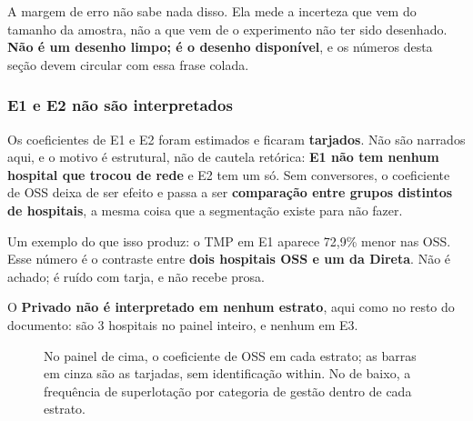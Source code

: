 A margem de erro não sabe nada disso. Ela mede a incerteza que vem do
tamanho da amostra, não a que vem de o experimento não ter sido desenhado.
\textbf{Não é um desenho limpo; é o desenho disponível}, e os números desta
seção devem circular com essa frase colada.

\subsubsection*{E1 e E2 não são interpretados}

Os coeficientes de E1 e E2 foram estimados e ficaram \textbf{tarjados}.
Não são narrados aqui, e o motivo é estrutural, não de cautela retórica:
\textbf{E1 não tem nenhum hospital que trocou de rede} e E2 tem um só. Sem
conversores, o coeficiente de OSS deixa de ser efeito e passa a ser
\textbf{comparação entre grupos distintos de hospitais}, a mesma coisa que
a segmentação existe para não fazer.

Um exemplo do que isso produz: o TMP em E1 aparece 72,9\% menor nas OSS. Esse
número é o contraste entre \textbf{dois hospitais OSS e um da Direta}. Não é
achado; é ruído com tarja, e não recebe prosa.

O \textbf{Privado não é interpretado em nenhum estrato}, aqui como no resto
do documento: são 3 hospitais no painel inteiro, e nenhum em E3.

\begin{figure}[H]
\centering
{}
\caption{No painel de cima, o coeficiente de OSS em cada estrato; as barras em
cinza são as tarjadas, sem identificação within. No de baixo, a frequência de
superlotação por categoria de gestão dentro de cada estrato.}
\label{fig:e3coef}
\end{figure}

